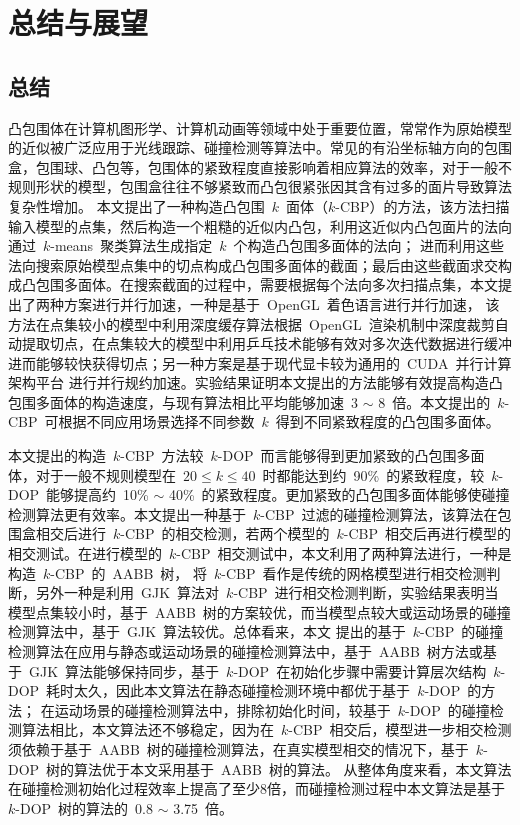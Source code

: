 

\chapter{总结与展望}
\label{cha:summery:futurework}
\section{总结}
\label{sec:summery}

凸包围体在计算机图形学、计算机动画等领域中处于重要位置，常常作为原始模型的近似被广泛应用于光线跟踪、碰撞检测等算法中。常见的有沿坐标轴方向的包围盒，包围球、凸包等，包围体的紧致程度直接影响着相应算法的效率，对于一般不规则形状的模型，包围盒往往不够紧致而凸包很紧张因其含有过多的面片导致算法复杂性增加。
本文提出了一种构造凸包围~$k$~面体（$k$-CBP）的方法，该方法扫描输入模型的点集，然后构造一个粗糙的近似内凸包，利用这近似内凸包面片的法向通过~$k$-means~聚类算法生成指定~$k$~个构造凸包围多面体的法向；
进而利用这些法向搜索原始模型点集中的切点构成凸包围多面体的截面；最后由这些截面求交构成凸包围多面体。在搜索截面的过程中，需要根据每个法向多次扫描点集，本文提出了两种方案进行并行加速，一种是基于~OpenGL~着色语言进行并行加速，
该方法在点集较小的模型中利用深度缓存算法根据~OpenGL~渲染机制中深度裁剪自动提取切点，在点集较大的模型中利用乒乓技术能够有效对多次迭代数据进行缓冲进而能够较快获得切点；另一种方案是基于现代显卡较为通用的~CUDA~并行计算架构平台
进行并行规约加速。实验结果证明本文提出的方法能够有效提高构造凸包围多面体的构造速度，与现有算法相比平均能够加速~3 $\sim$ 8~倍。本文提出的~$k$-CBP~可根据不同应用场景选择不同参数~$k$~得到不同紧致程度的凸包围多面体。

本文提出的构造~$k$-CBP~方法较~$k$-DOP~而言能够得到更加紧致的凸包围多面体，对于一般不规则模型在~$20 \leq k \leq 40 $~时都能达到约~90\%~的紧致程度，较~$k$-DOP~能够提高约~10\% $\sim$ 40\%~的紧致程度。更加紧致的凸包围多面体能够使碰撞检测算法更有效率。本文提出一种基于~$k$-CBP~过滤的碰撞检测算法，该算法在包围盒相交后进行~$k$-CBP~的相交检测，若两个模型的~$k$-CBP~相交后再进行模型的相交测试。在进行模型的~$k$-CBP~相交测试中，本文利用了两种算法进行，一种是构造~$k$-CBP~的~AABB~树，
将~$k$-CBP~看作是传统的网格模型进行相交检测判断，另外一种是利用~GJK~算法对~$k$-CBP~进行相交检测判断，实验结果表明当模型点集较小时，基于~AABB~树的方案较优，而当模型点较大或运动场景的碰撞检测算法中，基于~GJK~算法较优。总体看来，本文
提出的基于~$k$-CBP~的碰撞检测算法在应用与静态或运动场景的碰撞检测算法中，基于~AABB~树方法或基于~GJK~算法能够保持同步，基于~$k$-DOP~在初始化步骤中需要计算层次结构~$k$-DOP~耗时太久，因此本文算法在静态碰撞检测环境中都优于基于~$k$-DOP~的方法；
在运动场景的碰撞检测算法中，排除初始化时间，较基于~$k$-DOP~的碰撞检测算法相比，本文算法还不够稳定，因为在~$k$-CBP~相交后，模型进一步相交检测须依赖于基于~AABB~树的碰撞检测算法，在真实模型相交的情况下，基于~$k$-DOP~树的算法优于本文采用基于~AABB~树的算法。
从整体角度来看，本文算法在碰撞检测初始化过程效率上提高了至少8倍，而碰撞检测过程中本文算法是基于~$k$-DOP~树的算法的~0.8 $\sim$ 3.75~倍。

